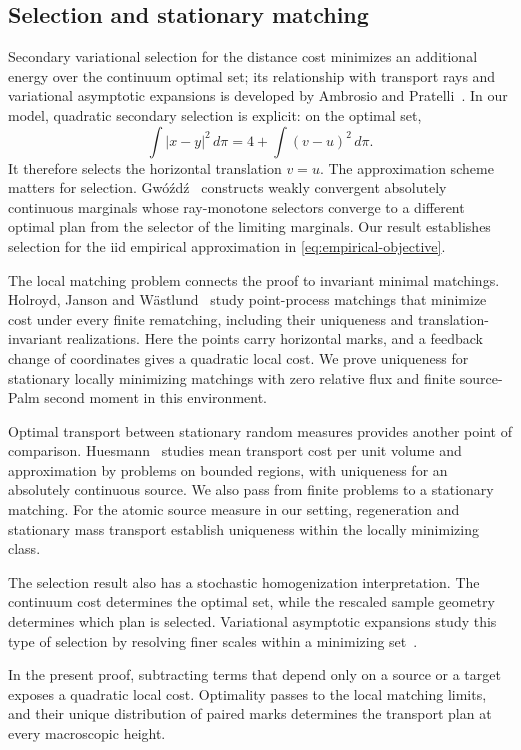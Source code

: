 \documentclass[11pt,reqno]{amsart}
\theoremstyle{definition}
\theoremstyle{remark}
\numberwithin{equation}{section}
\begin{document}
\subsection{Selection and stationary matching}

Secondary variational selection for the distance cost minimizes an
additional energy over the continuum optimal set; its relationship with
transport rays and variational asymptotic expansions is developed by
Ambrosio and Pratelli~\cite{AmbrosioPratelli}. In our model, quadratic
secondary selection is explicit: on the optimal set,
\[
\int |x-y|^2\,d\pi
=4+\int (v-u)^2\,d\pi.
\]
It therefore selects the horizontal translation \(v=u\).
The approximation scheme matters for selection. Gw\'{o}\'zd\'z~\cite{Gwozdz}
constructs weakly convergent absolutely continuous marginals whose
ray-monotone selectors converge to a different optimal plan from the
selector of the limiting marginals. Our result establishes selection for the
iid empirical approximation in \eqref{eq:empirical-objective}.

The local matching problem connects the proof to invariant minimal
matchings. Holroyd, Janson and W\"astlund~\cite{HolroydJansonWastlund}
study point-process matchings that minimize cost under every finite
rematching, including their uniqueness and translation-invariant
realizations. Here the points carry horizontal marks, and a feedback
change of coordinates gives a quadratic local cost. We prove uniqueness
for stationary locally minimizing matchings with zero relative flux and
finite source-Palm second moment in this environment.

Optimal transport between stationary random measures provides another
point of comparison. Huesmann~\cite{Huesmann} studies mean transport cost
per unit volume and approximation by problems on bounded regions, with
uniqueness for an absolutely continuous source. We also pass from finite
problems to a stationary matching. For the atomic source measure in our
setting, regeneration and stationary mass transport establish uniqueness
within the locally minimizing class.

The selection result also has a stochastic homogenization interpretation.
The continuum cost determines the optimal set, while the rescaled sample
geometry determines which plan is selected. Variational asymptotic
expansions study this type of selection by resolving finer scales within
a minimizing set~\cite{AmbrosioPratelli}.

In the present proof, subtracting terms that depend only on a source or
a target exposes a quadratic local cost. Optimality passes to the local
matching limits, and their unique distribution of paired marks determines
the transport plan at every macroscopic height.
\end{document}
